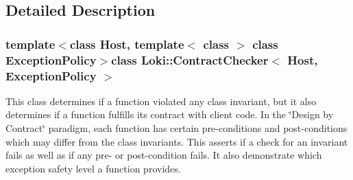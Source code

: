 \subsection{Detailed Description}
\subsubsection*{template$<$class Host, template$<$ class $>$ class Exception\+Policy$>$class Loki\+::\+Contract\+Checker$<$ Host, Exception\+Policy $>$}

This class determines if a function violated any class invariant, but it also determines if a function fulfills its contract with client code. In the \char`\"{}\+Design by Contract\char`\"{} paradigm, each function has certain pre-\/conditions and post-\/conditions which may differ from the class invariants. This asserts if a check for an invariant fails as well as if any pre-\/ or post-\/condition fails. It also demonstrate which exception safety level a function provides.

